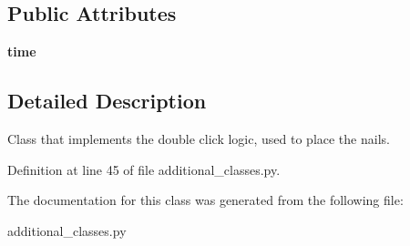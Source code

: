 \subsection*{Public Attributes}
\begin{DoxyCompactItemize}
\item 
\mbox{\label{classadditional__classes_1_1DoubleClick_aeaecde73ab3539246d00807f727e03be}} 
{\bfseries time}
\end{DoxyCompactItemize}


\subsection{Detailed Description}
Class that implements the double click logic, used to place the nails. 

Definition at line 45 of file additional\+\_\+classes.\+py.



The documentation for this class was generated from the following file\+:\begin{DoxyCompactItemize}
\item 
additional\+\_\+classes.\+py\end{DoxyCompactItemize}
